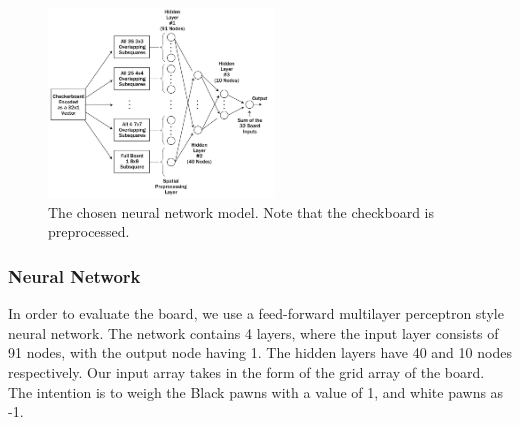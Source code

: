 \documentclass[12pt,a4paper]{article}
\begin{document}
    \begin{figure}[ht!]
        \centering
        \caption{The chosen neural network model. Note that the checkboard is preprocessed. \label{overflow}}
        \includegraphics[width=60mm]{nnmodel.png}
    \end{figure}

    
\subsubsection{Neural Network}

    In order to evaluate the board, we use a feed-forward multilayer perceptron style neural network. The network contains 4 layers, where the input layer consists of 91 nodes, with the output node having 1. The hidden layers have 40 and 10 nodes respectively. Our input array takes in the form of the grid array of the board. The intention is to weigh the Black pawns with a value of 1, and white pawns as -1. 
\end{document}
